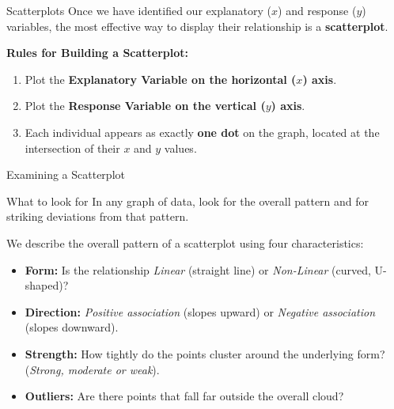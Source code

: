 \documentclass[aspectratio=169]{beamer}
\begin{document}

\begin{frame}{Scatterplots}
  Once we have identified our explanatory ($x$) and response ($y$) variables, the most effective way to display their relationship is a \textbf{scatterplot}.
  \vspace{0.3cm}
  
  \textbf{Rules for Building a Scatterplot:}
  \begin{enumerate}
    \item Plot the \textbf{Explanatory Variable on the horizontal ($x$) axis}.
    \item Plot the \textbf{Response Variable on the vertical ($y$) axis}.
    \item Each individual appears as exactly \textbf{one dot} on the graph, located at the intersection of their $x$ and $y$ values.
  \end{enumerate}
\end{frame}

\begin{frame}{Examining a Scatterplot}
  \begin{block}{What to look for}
    In any graph of data, look for the overall pattern and for striking deviations from that pattern.
  \end{block}
  \vspace{0.2cm}
  We describe the overall pattern of a scatterplot using four characteristics:
  \begin{itemize}
    \item \textbf{Form:} Is the relationship \emph{Linear} (straight line) or \emph{Non-Linear} (curved, U-shaped)?
    \item \textbf{Direction:} \emph{Positive association} (slopes upward) or \emph{Negative association} (slopes downward).
    \item \textbf{Strength:} How tightly do the points cluster around the underlying form? (\emph{Strong, moderate or weak}).
    \item \textbf{Outliers:} Are there points that fall far outside the overall cloud?
  \end{itemize}
\end{frame}
\end{document}
